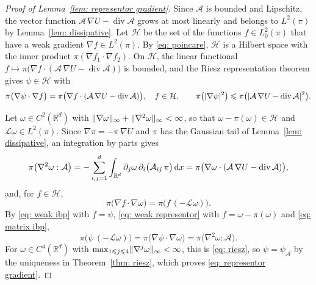 \begin{proof}[Proof of Lemma~\ref{lem: representor gradient}]
    Since $\mathcal A$ is bounded and Lipschitz, the vector function $\mathcal A\, \nabla U - \operatorname{div} \mathcal A$ grows at most linearly and belongs to $L^2(\pi)$ by Lemma~\ref{lem: dissipative}. Let $\mathcal H$ be the set of the functions $f \in L^2_0(\pi)$ that have a weak gradient $\nabla f \in L^2(\pi)$. By \eqref{eq: poincare}, $\mathcal H$ is a Hilbert space with the inner product $\pi(\nabla f_1 \cdot \nabla f_2)$. On $\mathcal H$, the linear functional $f \mapsto \pi\bigl( \nabla f \cdot ( \mathcal A\, \nabla U - \operatorname{div} \mathcal A ) \bigr)$ is bounded, and the Riesz representation theorem gives $\psi \in \mathcal H$ with
    \begin{equation}
        \pi\bigl( \nabla \psi \cdot \nabla f \bigr) = \pi\bigl( \nabla f \cdot ( \mathcal A\, \nabla U - \operatorname{div} \mathcal A ) \bigr) , \quad f \in \mathcal H , \qquad \pi\bigl( |\nabla \psi|^2 \bigr) \leqslant \pi\bigl( |\mathcal A\, \nabla U - \operatorname{div} \mathcal A|^2 \bigr) .
        \label{eq: weak representor}
    \end{equation}

    Let $\omega \in C^2(\mathbb R^d)$ with $\lVert \nabla \omega \rVert_\infty + \lVert \nabla^2 \omega \rVert_\infty < \infty$, so that $\omega - \pi(\omega) \in \mathcal H$ and $\mathcal L \omega \in L^2(\pi)$. Since $\nabla \pi = -\pi\, \nabla U$ and $\pi$ has the Gaussian tail of Lemma~\ref{lem: dissipative}, an integration by parts gives
    \begin{equation}
        \pi\bigl( \nabla^2 \omega : \mathcal A \bigr) = -\sum_{i,j=1}^{d} \int_{\mathbb R^d} \partial_j \omega\, \partial_i \bigl( \mathcal A_{ij}\, \pi \bigr)\, \mathrm{d} x = \pi\bigl( \nabla \omega \cdot ( \mathcal A\, \nabla U - \operatorname{div} \mathcal A ) \bigr) ,
        \label{eq: matrix ibp}
    \end{equation}
    and, for $f \in \mathcal H$,
    \begin{equation}
        \pi\bigl( \nabla f \cdot \nabla \omega \bigr) = \pi\bigl( f\, (-\mathcal L \omega) \bigr) .
        \label{eq: weak ibp}
    \end{equation}
    By \eqref{eq: weak ibp} with $f = \psi$, \eqref{eq: weak representor} with $f = \omega - \pi(\omega)$ and \eqref{eq: matrix ibp},
    \begin{equation*}
        \pi\bigl( \psi\, (-\mathcal L \omega) \bigr) = \pi\bigl( \nabla \psi \cdot \nabla \omega \bigr) = \pi\bigl( \nabla^2 \omega : \mathcal A \bigr) .
    \end{equation*}
    For $\omega \in C^4(\mathbb R^d)$ with $\max_{1 \leqslant j \leqslant 4} \lVert \nabla^j \omega \rVert_\infty < \infty$, this is \eqref{eq: riesz}, so $\psi = \psi_{\mathcal A}$ by the uniqueness in Theorem~\ref{thm: riesz}, which proves \eqref{eq: representor gradient}.


\end{proof}
